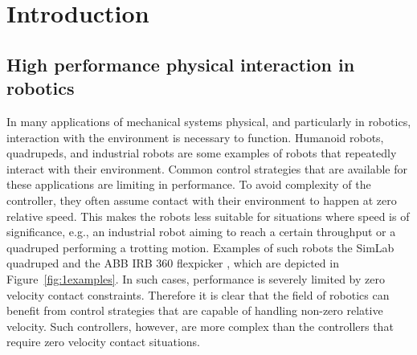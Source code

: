 \documentclass[../DC2017114Bouma.tex]{subfiles}
\begin{document}
\graphicspath{{01_Introduction/img/}}
\renewcommand{\chaptermark}[1]{\markboth{\thechapter.\ #1}{}}
\renewcommand{\sectionmark}[1]{\markright{#1}{}}
\cleartooddpage
\pagestyle{fancyreport}

\chapter{Introduction}\label{ch:intro}
\section{High performance physical interaction in robotics}
In many applications of mechanical systems physical, and particularly in robotics, interaction with the environment is necessary to function. Humanoid robots, quadrupeds, and industrial robots are some examples of robots that repeatedly interact with their environment. Common control strategies that are available for these applications are limiting in performance. To avoid complexity of the controller, they often assume contact with their environment to happen at zero relative speed. This makes the robots less suitable for situations where speed is of significance, e.g., an industrial robot aiming to reach a certain throughput or a quadruped performing a trotting motion. Examples of such robots the SimLab quadruped \cite{VTquad} and the ABB IRB 360 flexpicker \cite{Flexpicker}, which are depicted in Figure~\ref{fig:1examples}. In such cases, performance is severely limited by zero velocity contact constraints. Therefore it is clear that the field of robotics can benefit from control strategies that are capable of handling non-zero relative velocity. Such controllers, however, are more complex than the controllers that require zero velocity contact situations.
\end{document}

